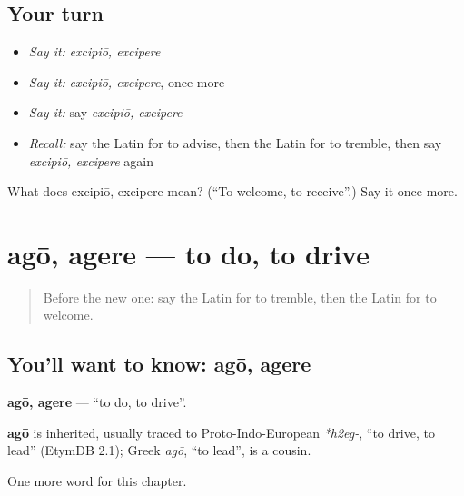 \subsection*{Your turn}
\begin{itemize}
\raggedright
  \item \emph{Say it:} \emph{excipiō, excipere}
  \item \emph{Say it:} \emph{excipiō, excipere}, once more
  \item \emph{Say it:} say \emph{excipiō, excipere}
  \item \emph{Recall:} say the Latin for to advise, then the Latin for to tremble, then say \emph{excipiō, excipere} again
\end{itemize}

\begin{tcolorbox}[breakable,colback=teal!4,colframe=teal!35!black,title={Before you move on}]
What does excipiō, excipere mean? (\textquotedblleft{}To welcome, to receive\textquotedblright{}.) Say it once more.
\end{tcolorbox}
\section[agō, agere]{agō, agere — to do, to drive}

\label{lesson:LA-C202-ago}



\begin{quote}
Before the new one: say the Latin for to tremble, then the Latin for to welcome.
\end{quote}

\subsection*{You'll want to know: agō, agere}
\textbf{agō, agere} — \textquotedblleft{}to do, to drive\textquotedblright{}.

\begin{cousinweb}
\textbf{agō} is inherited, usually traced to Proto-Indo-European \emph{*h2eg-}, \textquotedblleft{}to drive, to lead\textquotedblright{} (EtymDB 2.1); Greek \emph{agō}, \textquotedblleft{}to lead\textquotedblright{}, is a cousin.
\end{cousinweb}

\begin{grammarlens}[title={What you've built}]
One more word for this chapter.
\end{grammarlens}

